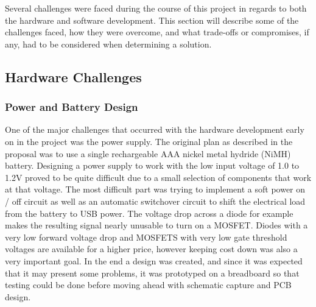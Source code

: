 Several challenges were faced during the course of this project in regards to both the
hardware and software development. This section will describe some of the 
challenges faced, how they were overcome, and what trade-offs or compromises,
if any, had to be considered when determining a solution.

\subsection{Hardware Challenges}

\subsubsection{Power and Battery Design}

One of the major challenges that occurred with the hardware development early
on in the project was the power supply. The original plan as described in the 
proposal was to use a single rechargeable AAA nickel metal hydride (NiMH) 
battery. Designing a power supply to work with the low input voltage of 1.0 to 1.2V 
proved to be quite difficult due to a small selection of components that 
work at that voltage. The most difficult part was trying to implement a soft 
power on / off circuit as well as an automatic switchover circuit to shift the 
electrical load from the battery to USB power. The voltage drop across a diode 
for example makes the resulting signal nearly unusable to turn on a MOSFET. 
Diodes with a very low forward voltage drop and MOSFETS with very low gate 
threshold voltages are available for a higher price, however keeping cost down was 
also a very important goal. In the end a design was created, and since it was 
expected that it may present some problems, it was prototyped on a breadboard 
so that testing could be done before moving ahead with schematic capture and 
PCB design.

